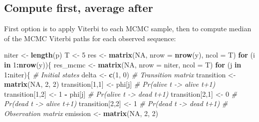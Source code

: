 \documentclass[
  12pt,
]{krantz}
\newenvironment{Shaded}{\begin{snugshade}}{\end{snugshade}}
\newcommand{\AttributeTok}[1]{\textcolor[rgb]{0.13,0.29,0.53}{#1}}
\newcommand{\CommentTok}[1]{\textcolor[rgb]{0.56,0.35,0.01}{\textit{#1}}}
\newcommand{\ConstantTok}[1]{\textcolor[rgb]{0.56,0.35,0.01}{#1}}
\newcommand{\ControlFlowTok}[1]{\textcolor[rgb]{0.13,0.29,0.53}{\textbf{#1}}}
\newcommand{\DecValTok}[1]{\textcolor[rgb]{0.00,0.00,0.81}{#1}}
\newcommand{\FunctionTok}[1]{\textcolor[rgb]{0.13,0.29,0.53}{\textbf{#1}}}
\newcommand{\NormalTok}[1]{#1}
\newcommand{\OtherTok}[1]{\textcolor[rgb]{0.56,0.35,0.01}{#1}}
\newcommand{\SpecialCharTok}[1]{\textcolor[rgb]{0.81,0.36,0.00}{\textbf{#1}}}
\begin{document}
\subsection{Compute first, average after}\label{compute-average}

First option is to apply Viterbi to each MCMC sample, then to compute median of the MCMC Viterbi paths for each observed sequence:

\begin{Shaded}
\begin{Highlighting}[]
\NormalTok{niter }\OtherTok{\textless{}{-}} \FunctionTok{length}\NormalTok{(p)}
\NormalTok{T }\OtherTok{\textless{}{-}} \DecValTok{5}
\NormalTok{res }\OtherTok{\textless{}{-}} \FunctionTok{matrix}\NormalTok{(}\ConstantTok{NA}\NormalTok{, }\AttributeTok{nrow =} \FunctionTok{nrow}\NormalTok{(y), }\AttributeTok{ncol =}\NormalTok{ T)}
\ControlFlowTok{for}\NormalTok{ (i }\ControlFlowTok{in} \DecValTok{1}\SpecialCharTok{:}\FunctionTok{nrow}\NormalTok{(y))\{}
\NormalTok{  res\_mcmc }\OtherTok{\textless{}{-}} \FunctionTok{matrix}\NormalTok{(}\ConstantTok{NA}\NormalTok{, }\AttributeTok{nrow =}\NormalTok{ niter, }\AttributeTok{ncol =}\NormalTok{ T)}
  \ControlFlowTok{for}\NormalTok{ (j }\ControlFlowTok{in} \DecValTok{1}\SpecialCharTok{:}\NormalTok{niter)\{}
    \CommentTok{\# Initial states}
\NormalTok{    delta }\OtherTok{\textless{}{-}} \FunctionTok{c}\NormalTok{(}\DecValTok{1}\NormalTok{, }\DecValTok{0}\NormalTok{)}
    \CommentTok{\# Transition matrix}
\NormalTok{    transition }\OtherTok{\textless{}{-}} \FunctionTok{matrix}\NormalTok{(}\ConstantTok{NA}\NormalTok{, }\DecValTok{2}\NormalTok{, }\DecValTok{2}\NormalTok{)}
\NormalTok{    transition[}\DecValTok{1}\NormalTok{,}\DecValTok{1}\NormalTok{] }\OtherTok{\textless{}{-}}\NormalTok{ phi[j]      }\CommentTok{\# Pr(alive t {-}\textgreater{} alive t+1)}
\NormalTok{    transition[}\DecValTok{1}\NormalTok{,}\DecValTok{2}\NormalTok{] }\OtherTok{\textless{}{-}} \DecValTok{1} \SpecialCharTok{{-}}\NormalTok{ phi[j]  }\CommentTok{\# Pr(alive t {-}\textgreater{} dead t+1)}
\NormalTok{    transition[}\DecValTok{2}\NormalTok{,}\DecValTok{1}\NormalTok{] }\OtherTok{\textless{}{-}} \DecValTok{0}        \CommentTok{\# Pr(dead t {-}\textgreater{} alive t+1)}
\NormalTok{    transition[}\DecValTok{2}\NormalTok{,}\DecValTok{2}\NormalTok{] }\OtherTok{\textless{}{-}} \DecValTok{1}        \CommentTok{\# Pr(dead t {-}\textgreater{} dead t+1)}
    \CommentTok{\# Observation matrix }
\NormalTok{    emission }\OtherTok{\textless{}{-}} \FunctionTok{matrix}\NormalTok{(}\ConstantTok{NA}\NormalTok{, }\DecValTok{2}\NormalTok{, }\DecValTok{2}\NormalTok{)}

\end{Highlighting}
\end{Shaded}
\end{document}
